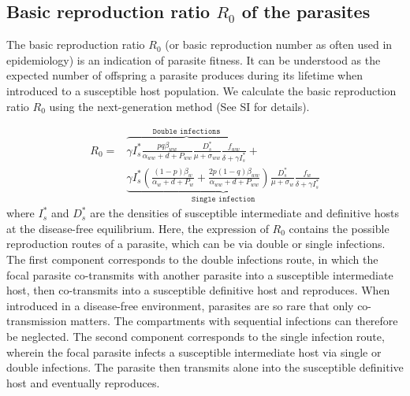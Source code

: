 \documentclass[11pt]{article}
\begin{document}
\subsection*{Basic reproduction ratio $R_0$ of the parasites}

The basic reproduction ratio $R_0$ (or basic reproduction number as often used in epidemiology) is an indication of parasite fitness. 
It can be understood as the expected number of offspring a parasite produces during its lifetime when introduced to a susceptible host population. 
We calculate the basic reproduction ratio $R_0$ using the next-generation method \citep{Diekmann1990, Diekmann2009, Hurford2009} (See SI for details).

\begin{align}
R_0 = & \overbrace{\gamma I_s^* \frac{ p q \beta_{ww}}{\alpha_{ww} + d + P_{ww}} \frac{D_s^*}{\mu +\sigma_{ww}} \frac{f_{ww}}{\delta +\gamma I_s^*}}^{ \texttt{Double infections}} + \nonumber \\
& \underbrace{\gamma  I_s^* \left( \frac{ (1-p)\beta_w}{\alpha_w + d + P_w} + \frac{2 p (1-q) \beta_{ww}}{\alpha_{ww} + d + P_{ww}} \right) \frac{D_s^*}{\mu + \sigma_w} \frac{f_w}{\delta +\gamma  I_s^*}}_{\texttt{Single infection}}
\end{align}
%
where $I_s^*$ and $D_s^*$ are the densities of susceptible intermediate and definitive hosts at the disease-free equilibrium. 
Here, the expression of $R_0$ contains the possible reproduction routes of a parasite, which can be via double or single infections. 
The first component corresponds to the double infections route, in which the focal parasite co-transmits with another parasite into a susceptible intermediate host, then co-transmits into a susceptible definitive host and reproduces. 
When introduced in a disease-free environment, parasites are so rare that only co-transmission matters. 
The compartments with sequential infections can therefore be neglected. 
The second component corresponds to the single infection route, wherein the focal parasite infects a susceptible intermediate host via single or double infections. 
The parasite then transmits alone into the susceptible definitive host and eventually reproduces. 
\end{document}
